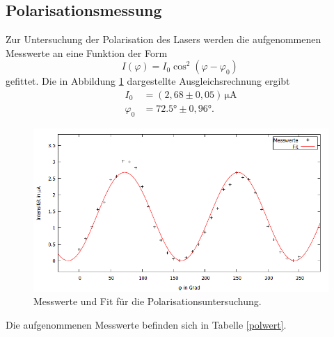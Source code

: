 \subsection{Polarisationsmessung}
Zur Untersuchung der Polarisation des Lasers werden die aufgenommenen Messwerte an eine Funktion der Form
\begin{equation}
   I(\varphi) = I_0 \cos^2\!\left(\varphi-\varphi_0\right)\,
\end{equation}
gefittet. Die in Abbildung \ref{polfit} dargestellte Ausgleichsrechnung ergibt
\begin{align*}
 I_0 &=(2,68 \pm 0,05)\, \si{\micro\ampere}\\
 \varphi_0 &=72.5° \pm 0,96°.
\end{align*}
\begin{figure}[H]
  \centering
  \includegraphics[width=14cm]{bilder/polarplot.png}
  \caption{Messwerte und Fit für die Polarisationsuntersuchung.}
  \label{polfit}
\end{figure}
Die aufgenommenen Messwerte befinden sich in Tabelle \ref{polwert}.
